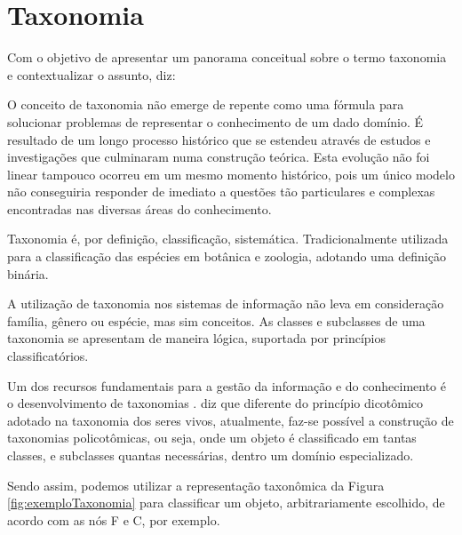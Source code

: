 \section{Taxonomia}
\label{sec:taxonomia}
Com o objetivo de apresentar um panorama conceitual sobre o termo taxonomia e contextualizar o assunto,  diz:

\hspace{4cm}
\begin{minipage}{.66\textwidth}		
    \begin{singlespace}
        \fontsize{10}{12}\selectfont O conceito de taxonomia não emerge de repente como uma fórmula para solucionar problemas de representar o conhecimento de um dado domínio.
        É resultado de um longo processo histórico que se estendeu através de estudos e investigações que culminaram numa construção teórica.
        Esta evolução não foi linear tampouco ocorreu em um mesmo momento histórico, pois um único modelo não conseguiria responder de imediato a questões tão particulares 
        e complexas encontradas nas diversas áreas do conhecimento.
        \end{singlespace}
\end{minipage}
\vspace{0.3CM}

Taxonomia é, por definição, classificação, sistemática. Tradicionalmente utilizada para a classificação das espécies em botânica e zoologia, adotando uma definição binária.
\par
A utilização de taxonomia nos sistemas de informação não leva em consideração família, gênero ou espécie, mas sim conceitos.
As classes e subclasses de uma taxonomia se apresentam de maneira lógica, suportada por princípios classificatórios.\cite{campos2012taxonomia}
\par
Um dos recursos fundamentais para a gestão da informação e do conhecimento é o desenvolvimento de taxonomias \cite{dal2015ferramentas}.
 diz que diferente do princípio dicotômico adotado na taxonomia dos seres vivos, atualmente, faz-se possível a construção de taxonomias
policotômicas, ou seja, onde um objeto é classificado em tantas classes, e subclasses quantas necessárias, dentro um domínio especializado.
\par
Sendo assim, podemos utilizar a representação taxonômica da Figura \ref{fig:exemploTaxonomia} para classificar um objeto, arbitrariamente escolhido,
de acordo com as nós F e C, por exemplo.

